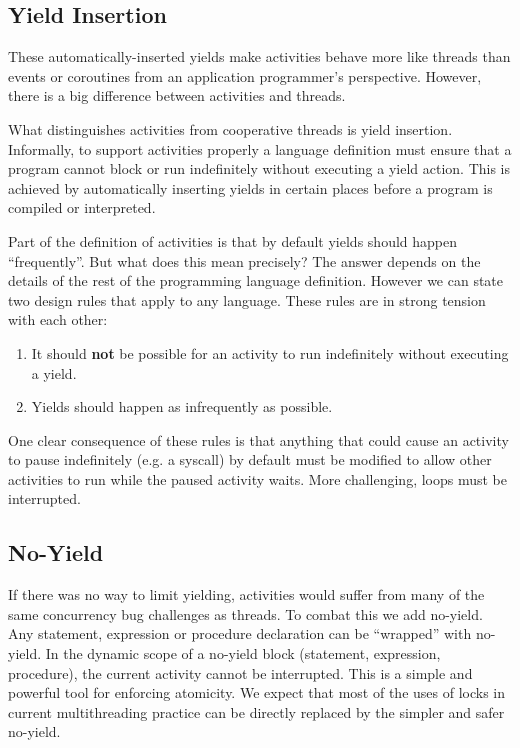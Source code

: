 \documentclass[10pt,preprint]{sigplanconf}
\begin{document}
\subsection{Yield Insertion}

These automatically-inserted yields make activities behave more like threads than events or coroutines from an application programmer's perspective.
However, there is a big difference between activities and threads.

%

What distinguishes activities from cooperative threads is yield insertion.
Informally, to support activities properly a language definition must ensure that a program cannot block or run indefinitely without executing a yield action.
This is achieved by automatically inserting yields in certain places before a program is compiled or interpreted.



Part of the definition of activities is that by default yields should happen ``frequently''.
But what does this mean precisely?
The answer depends on the details of the rest of the programming language definition.
However we can state two design rules that apply to any language.
These rules are in strong tension with each other:

\begin{enumerate}
\item It should \textbf{not} be possible for an activity to run indefinitely without executing a yield.
\item Yields should happen as infrequently as possible.
\end{enumerate}

One clear consequence of these rules is that anything that could cause an activity to pause indefinitely (e.g. a syscall) by default must be modified to allow other activities to run while the paused activity waits.
More challenging, loops must be interrupted.

\subsection{No-Yield}

If there was no way to limit yielding, activities would suffer from many of the same concurrency bug challenges as threads.
To combat this we add no-yield.
Any statement, expression or procedure declaration can be ``wrapped'' with no-yield.
In the dynamic scope of a no-yield block (statement, expression, procedure), the current activity cannot be interrupted.
This is a simple and powerful tool for enforcing atomicity.
We expect that most of the uses of locks in current multithreading practice can be directly replaced by the simpler and safer no-yield.
\end{document}
